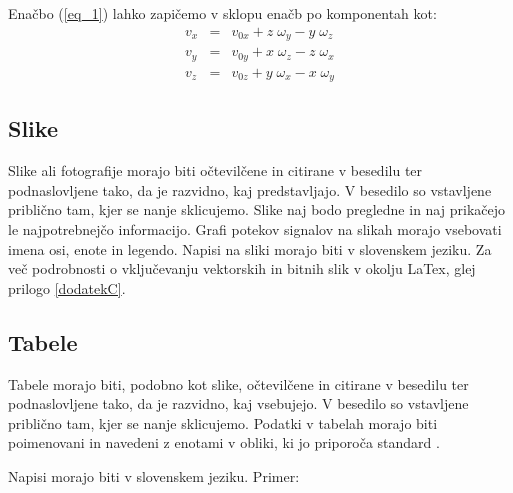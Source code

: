 \documentclass[a4paper,twoside,openright,12pt]{book}
\begin{document}
{Enačbo (\ref{eq_1}) lahko zapičemo v sklopu enačb po komponentah
kot:
\begin{eqnarray}
  v_x  &=& v_{0x} + z \;\omega_y - y \;\omega_z \nonumber \\
  v_y  &=& v_{0y} + x \;\omega_z - z \;\omega_x  \\
  v_z  &=& v_{0z} + y \;\omega_x - x \;\omega_y \nonumber
\end{eqnarray}

\subsection{Slike} \label{vnos_slik}

Slike ali fotografije morajo biti očtevilčene in citirane v besedilu
ter podnaslovljene tako, da je razvidno, kaj predstavljajo. V
besedilo so vstavljene priblično tam, kjer se nanje sklicujemo.
Slike naj bodo pregledne in naj prikačejo le najpotrebnejčo
informacijo. Grafi potekov signalov na slikah morajo vsebovati imena
osi, enote in legendo. Napisi na sliki morajo biti v slovenskem
jeziku. Za več podrobnosti o vključevanju vektorskih in bitnih slik v
okolju LaTex, glej prilogo \ref{dodatekC}.










\subsection{Tabele}

Tabele morajo biti, podobno kot slike, očtevilčene in citirane v
besedilu ter podnaslovljene tako, da je razvidno, kaj vsebujejo. V
besedilo so vstavljene priblično tam, kjer se nanje sklicujemo.
Podatki v tabelah morajo biti poimenovani in navedeni z enotami v
obliki, ki jo priporoča standard \cite{standard_sist_v,
standard_sist_80000}.

Napisi morajo biti v slovenskem jeziku. Primer:

}
\end{document}

